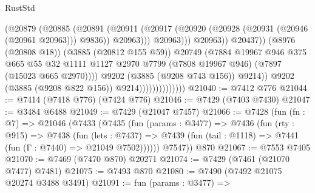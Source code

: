 \begin{lexlean}{RustStd}
\begin{coremodule}
                                                (@20879
                                                  (@20885
                                                    (@20891
                                                      (@20911
                                                        (@20917
                                                          (@20920
                                                            (@20928
                                                              (@20931 (@20946 (@20961 @20963)))
                                                              @9836))
                                                          @20963)))
                                                    @20963)))
                                              @20963))
                                          @20437))
                                      (@8976 (@20808 @18))
                                      (@3885 (@20812 @155 @59))
                                      @20749
                                      (@7884
                                        @19967
                                        @946
                                        @375
                                        @665
                                        @55
                                        @32
                                        @1111
                                        @1127
                                        @2970
                                        @7799
                                        (@7808 @19967 @946)
                                        (@7897 (@15023 @665 @2970))))
                                    @9202
                                    (@3885 (@9208 @743 @156))
                                    @9214))
                                @9202
                                (@3885 (@9208 @822 @156))
                                @9214))))))))))))))
@21040 := @7412 @776
@21044 := @7414 (@7418 @776) (@7424 @776)
@21046 := @7429 (@7403 @7430)
@21047 := @3484 @6488
@21049 := @7429 (@21047 @7457)
@21066 := @7428
    (fun (fn : @7) =>
    @21046
      (@7433
        (@7435
          (fun (params : @3477) =>
          @7436
            (fun (rty : @915) =>
            @7438
              (fun (lets : @7437) =>
              @7439 (fun (tail : @1118) => @7441 (fun (Γ : @7440) => @21049 @7502))))))
        @7547))
    @870
@21067 := @7553 @7405
@21070 := @7469 (@7470 @870) @20271
@21074 := @7429 (@7461 (@21070 @7477) @7481)
@21075 := @7493 @870
@21080 := @7490 (@7492 @21075 @20274 @3488 @3491)
@21091 := fun (params : @3477) =>

\end{coremodule}
\end{lexlean}
